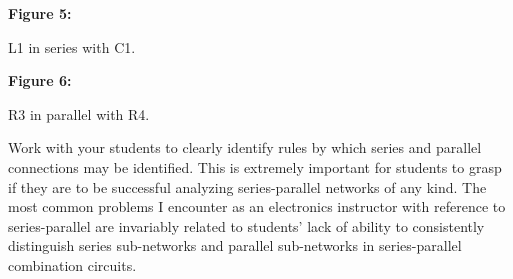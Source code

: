 \noindent
{\bf Figure 5:}

L1 in series with C1.

\vskip 10pt

\noindent
{\bf Figure 6:}

R3 in parallel with R4.







Work with your students to clearly identify rules by which series and parallel connections may be identified.  This is extremely important for students to grasp if they are to be successful analyzing series-parallel networks of any kind.  The most common problems I encounter as an electronics instructor with reference to series-parallel are invariably related to students' lack of ability to consistently distinguish series sub-networks and parallel sub-networks in series-parallel combination circuits.




